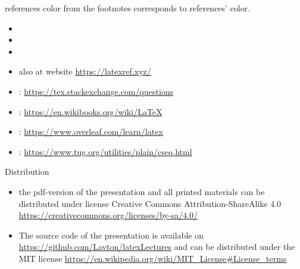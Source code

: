 \documentclass[14pt, aspectratio=169]{beamer}
\begin{document}
\begin{frame}[allowframebreaks]{references}
color from the footnotes corresponds to references' color.
    \begin{itemize}
        \item {}
        \item {}
        \item {}
        \item {} also at website \url{https://latexref.xyz/}
        \item {} : \url{https://tex.stackexchange.com/questions}
        \item {} : \url{https://en.wikibooks.org/wiki/LaTeX}
        \item {} : \url{https://www.overleaf.com/learn/latex}
        \item {} : \url{https://www.tug.org/utilities/plain/cseq.html}
    \end{itemize}
\end{frame}

\begin{frame}{Distribution}\relax
\begin{itemize}
     \item the pdf-version of the presentation and all printed materials can be distributed under license Creative Commons Attribution-ShareAlike 4.0 \url{https://creativecommons.org/licenses/by-sa/4.0/}
     \item The source code of the presentation is available on {\csk\url{https://github.com/Lavton/latexLectures}} and can be distributed under the MIT license \url{https://en.wikipedia.org/wiki/MIT_License\#License_terms}
\end{itemize}
     
\end{frame}
\end{document}
